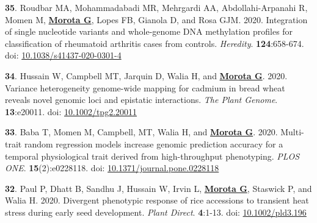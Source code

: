 \documentclass[margin,line,10pt]{res}
\newenvironment{list1}{
  \begin{list}{\ding{113}}{%
      \setlength{\itemsep}{0in}
      \setlength{\parsep}{0in} \setlength{\parskip}{0in}
      \setlength{\topsep}{0in} \setlength{\partopsep}{0in} 
      \setlength{\leftmargin}{0.17in}}}{\end{list}}
\begin{document}
\begin{resume}
\begin{list1}
  \vspace{0.5cm}

\item  [{\bf 35}.] Roudbar MA, Mohammadabadi MR, Mehrgardi AA, Abdollahi-Arpanahi R,  Momen M, \textbf{\underline{Morota G}}, Lopes FB, Gianola D, and Rosa GJM. 2020. Integration of single nucleotide variants and whole-genome DNA methylation profiles for classification of rheumatoid arthritis cases from controls. \emph{Heredity}. \textbf{124}:658-674. doi: \textcolor{blue}{\href{https://doi.org/10.1038/s41437-020-0301-4}{10.1038/s41437-020-0301-4}} 
  
      \vspace{0.5cm}

  \item  [{\bf 34}.]  Hussain W, Campbell MT, Jarquin D, Walia H, and \textbf{\underline{Morota G}}. 2020. Variance heterogeneity genome-wide mapping for cadmium in bread wheat reveals novel genomic loci and epistatic interactions. \emph{The Plant Genome}. \textbf{13}:e20011. doi: \textcolor{blue}{\href{https://doi.org/10.1002/tpg2.20011}{10.1002/tpg2.20011}}

    \vspace{0.5cm}
    
  \item  [{\bf 33}.] Baba T, Momen M, Campbell, MT, Walia H, and \textbf{\underline{Morota G}}. 2020. Multi-trait random regression models increase genomic prediction accuracy for a temporal physiological trait derived from high-throughput phenotyping. \emph{PLOS ONE}. \textbf{15}(2):e0228118. doi: \textcolor{blue}{\href{https://doi.org/10.1371/journal.pone.0228118}{10.1371/journal.pone.0228118}}
  
  \vspace{0.5cm}

\item [{\bf 32}.] Paul P, Dhatt B, Sandhu J, Hussain W, Irvin L, \textbf{\underline{Morota G}}, Staswick P, and Walia H. 2020. Divergent phenotypic response of rice accessions to transient heat stress during early seed development. \emph{Plant Direct}. \textbf{4}:1-13. doi: \textcolor{blue}{\href{https://doi.org/10.1002/pld3.196}{10.1002/pld3.196}}

  \end{list1}


\section{}
\begin{list1}
  

\end{list1}
\end{resume}
\end{document}
